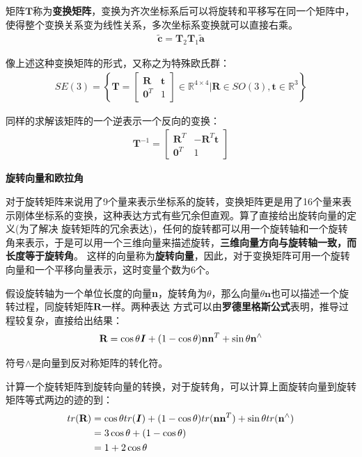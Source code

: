 \documentclass[10pt]{article}
\begin{document}
矩阵$\textbf{T}$称为\textbf{变换矩阵}，变换为齐次坐标系后可以将旋转和平移写在同一个矩阵中，使得整个变换关系变为线性关系，多次坐标系变换就可以直接右乘。
\begin{align}\widetilde{\textbf{c}}=\textbf{T}_2 \textbf{T}_1 \widetilde{\textbf{a}}\end{align}

像上述这种变换矩阵的形式，又称之为特殊欧氏群：
\begin{align}SE(3)=\left\{\textbf{T}=\left[\begin{array}{cc}\textbf{R}&\textbf{t} \\ \textbf{0}^{T}&1\end{array}\right] \in \mathbb{R}^{4 \times 4}
|\textbf{R}\in SO(3),\textbf{t}\in \mathbb{R}^{3}\right\}\end{align}

同样的求解该矩阵的一个逆表示一个反向的变换：
\begin{align}\textbf{T}^{-1}=\left[\begin{array}{cc}\textbf{R}^{T}&-\textbf{R}^{T}\textbf{t} \\ \textbf{0}^{T}&1 \end{array}\right]\end{align}

\textbf{旋转向量和欧拉角}

对于旋转矩阵来说用了9个量来表示坐标系的旋转，变换矩阵更是用了16个量来表示刚体坐标系的变换，这种表达方式有些冗余但直观。算了直接给出旋转向量的定义(为了解决
旋转矩阵的冗余表达)，任何的旋转都可以用一个旋转轴和一个旋转角来表示，于是可以用一个三维向量来描述旋转，\textbf{三维向量方向与旋转轴一致，而长度等于旋转角}。
这样的向量称为\textbf{旋转向量}，因此，对于变换矩阵可用一个旋转向量和一个平移向量表示，这时变量个数为6个。

假设旋转轴为一个单位长度的向量\textbf{n}，旋转角为$\theta$，那么向量$\theta\textbf{n}$也可以描述一个旋转过程，同旋转矩阵$\textbf{R}$一样。两种表达
方式可以由\textbf{罗德里格斯公式}表明，推导过程较复杂，直接给出结果：
\begin{equation}\textbf{R}=\cos\theta\textbf{\emph{I}}+(1-\cos\theta)\textbf{n}\textbf{n}^{T}+\sin\theta\textbf{n}^{\wedge}\end{equation}

符号$\wedge$是向量到反对称矩阵的转化符。

计算一个旋转矩阵到旋转向量的转换，对于旋转角，可以计算上面旋转向量到旋转矩阵等式两边的迹的到：
\begin{align}
    tr(\textbf{R}) & =\cos\theta tr(\textbf{\emph{I}})+(1-\cos\theta)tr(\textbf{n}\textbf{n}^T)+\sin\theta tr(\textbf{n}^{\wedge}) \notag \\
                   & =3\cos\theta+(1-\cos\theta) \notag \\
                   & =1+2\cos\theta         
\end{align}
\end{document}
